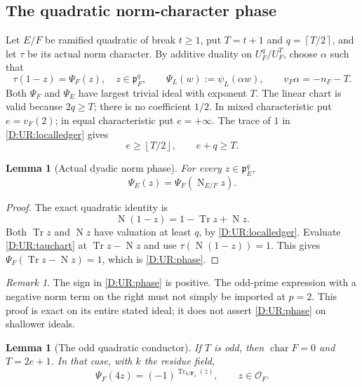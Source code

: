 \documentclass[11pt]{amsart}
\newtheorem{lemma}[theorem]{Lemma}
\theoremstyle{definition}
\theoremstyle{remark}
\newtheorem{remark}[theorem]{Remark}
\newcommand{\F}{\mathbf F}
\newcommand{\Tr}{\operatorname{Tr}}
\newcommand{\Nm}{\operatorname{N}}
\newcommand{\ceil}[1]{\left\lceil #1\right\rceil}
\newcommand{\floor}[1]{\left\lfloor #1\right\rfloor}
\newcommand{\OO}{\mathcal O}\newcommand{\pp}{\mathfrak p}\newcommand{\PP}{\mathfrak P}
\begin{document}
\subsection{The quadratic norm-character phase}
Let $E/F$ be ramified quadratic of break $t\ge1$, put $T=t+1$ and
$q=\ceil{T/2}$, and let $\tau$ be its actual norm character. By additive
duality on $U_F^q/U_F^T$, choose $\alpha$ such that
\begin{equation}\label{D:UR:tauchart}
 \tau(1-z)=\Psi_F(z),\quad z\in\pp_F^q,\qquad
 \Psi_L(w):=\psi_L(\alpha w),\qquad v_F\alpha=-n_F-T.
\end{equation}
Both $\Psi_F$ and $\Psi_E$ have largest trivial ideal with exponent $T$.
The linear chart is valid because $2q\ge T$; there is no coefficient $1/2$.
In mixed characteristic put $e=v_F(2)$; in equal characteristic put
$e=+\infty$. The trace of $1$ in \eqref{D:UR:localledger} gives
\begin{equation}\label{D:UR:ebound}
 e\ge\floor{T/2},\qquad e+q\ge T.
\end{equation}
\begin{lemma}[Actual dyadic norm phase]\label{D:UR:normphase}
For every $z\in\pp_E^q$,
\begin{equation}\label{D:UR:phase}
 \Psi_E(z)=\Psi_F(\Nm_{E/F}z).
\end{equation}
\end{lemma}
\begin{proof}
The exact quadratic identity is
\[
 \Nm(1-z)=1-\Tr z+\Nm z.
\]
Both $\Tr z$ and $\Nm z$ have valuation at least $q$, by
\eqref{D:UR:localledger}. Evaluate \eqref{D:UR:tauchart} at $\Tr z-\Nm z$ and use
$\tau(\Nm(1-z))=1$. This gives
$\Psi_F(\Tr z-\Nm z)=1$, which is \eqref{D:UR:phase}.
\end{proof}
\begin{remark}
The sign in \eqref{D:UR:phase} is positive. The odd-prime expression with a
negative norm term on the right must not simply be imported at $p=2$.
This proof is exact on its entire stated ideal; it does not assert
\eqref{D:UR:phase} on shallower ideals.
\end{remark}
\begin{lemma}[The odd quadratic conductor]\label{D:UR:oddT}
If $T$ is odd, then $\operatorname{char}F=0$ and $T=2e+1$. In that case,
with $k$ the residue field,
\begin{equation}\label{D:UR:critical4}
 \Psi_F(4z)=(-1)^{\Tr_{k/\F_2}(\bar z)},\qquad z\in\OO_F.
\end{equation}
\end{lemma}
\end{document}
